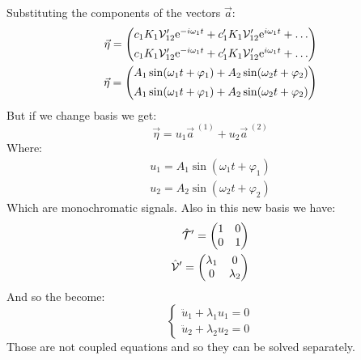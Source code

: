 Substituting the components of the vectors $\vec{a}$:
\begin{equation}
    \begin{split}
        \vec{\eta} = \begin{pmatrix}
            c_1 K_1\mathcal{V}'_{12}\mathrm{e}^{-i\omega_1 t} + c_1' K_1\mathcal{V}'_{12}\mathrm{e}^{i\omega_1 t} + \dots\\[5pt]
            c_1 K_1\mathcal{V}'_{12}\mathrm{e}^{-i\omega_1 t} + c_1' K_1\mathcal{V}'_{12}\mathrm{e}^{i\omega_1 t} + \dots
        \end{pmatrix}\\
        \vec{\eta} = \begin{pmatrix}
            A_1 \sin(\omega_1 t + \varphi_1) + A_2 \sin(\omega_2 t + \varphi_2)\\[5pt]
            A_1 \sin(\omega_1 t + \varphi_1) + A_2 \sin(\omega_2 t + \varphi_2)
        \end{pmatrix}
    \end{split}
\end{equation}
But if we change basis we get:
\begin{equation}
    \vec{\eta} = u_1 \vec{a}^{\;(1)} + u_2 \vec{a}^{\;(2)}
\end{equation}
Where:
\begin{equation}
    \begin{split}
        u_1 = A_1 \sin(\omega_1 t + \varphi_1)\\
        u_2 = A_2 \sin(\omega_2 t + \varphi_2)
    \end{split}
\end{equation}
Which are monochromatic signals. Also in this new basis we have:
\begin{equation}
    \begin{split}
        \hat{\mathcal{T}}' = \begin{pmatrix}
            1 & 0\\
            0 & 1
        \end{pmatrix}\\
        \hat{\mathcal{V}}' = \begin{pmatrix}
            \lambda_1 & 0\\
            0 & \lambda_2
        \end{pmatrix}
    \end{split}
\end{equation}
And so the \eleref\;become:
\begin{equation}
    \begin{cases}
        \ddot{u}_1+\lambda_1 u_1 = 0\\
        \ddot{u}_2+\lambda_2 u_2 = 0
    \end{cases}
\end{equation}
Those are not coupled equations and so they can be solved separately.


